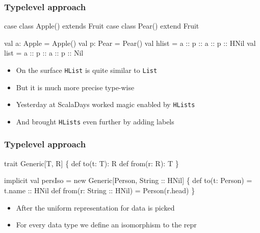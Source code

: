 \documentclass[svgnames,hyperref={bookmarks=false}]{beamer}
\begin{document}
\begin{frame}[fragile]
\frametitle{Typelevel approach}

\begin{semiverbatim}
case class Apple() extends Fruit
case class Pear() extend Fruit

val a: Apple = Apple()
val p: Pear = Pear()
val hlist = a :: p :: a :: p :: HNil
val list = a :: p :: a :: p :: Nil

\end{semiverbatim}
\onslide

\begin{itemize}
\item On the surface \texttt{HList} is quite similar to \texttt{List}
\pause
\item But it is much more precise type-wise
\item Yesterday at ScalaDays  worked magic enabled by \texttt{HLists}
\item And  brought \texttt{HLists} even further by adding labels
\end{itemize}
\end{frame}

\begin{frame}[fragile]
\frametitle{Typelevel approach}

\begin{semiverbatim}
trait Generic[T, R] \{
  def to(t: T): R
  def from(r: R): T
\}

implicit val persIso = new Generic[Person, String :: HNil] \{
  def to(t: Person) = t.name :: HNil
  def from(r: String :: HNil) = Person(r.head)
\}

\end{semiverbatim}

\begin{itemize}
\item After the uniform representation for data is picked
\item For every data type we define an isomorphism to the repr
\end{itemize}
\end{frame}
\end{document}
